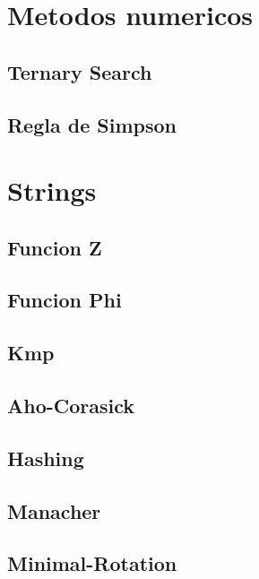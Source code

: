 \section{Metodos numericos}
\subsection{Ternary Search}
\raggedbottom
\hrulefill
\subsection{Regla de Simpson}
\raggedbottom
\hrulefill

\section{Strings}
\subsection{Funcion Z}
\raggedbottom
\hrulefill
\subsection{Funcion Phi}
\raggedbottom
\hrulefill
\subsection{Kmp}
\raggedbottom
\hrulefill
\subsection{Aho-Corasick}
\raggedbottom
\hrulefill
\subsection{Hashing}
\raggedbottom
\hrulefill
\subsection{Manacher}
\raggedbottom
\hrulefill
\subsection{Minimal-Rotation}
\raggedbottom
\hrulefill
